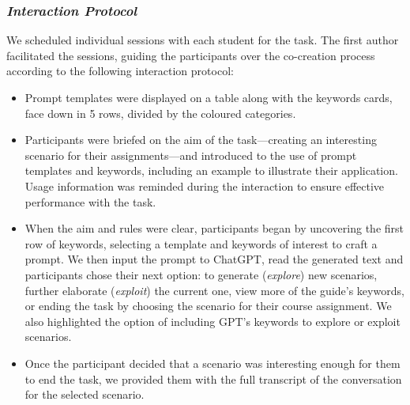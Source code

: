 \documentclass[sn-mathphys, Numbered]{sn-jnl}%
\theoremstyle{thmstyleone}%
\theoremstyle{thmstyletwo}%
\theoremstyle{thmstylethree}%
\begin{document}
\subsubsection*{\textit{Interaction Protocol}}

We scheduled individual sessions with each student for the task. The first author facilitated the sessions, guiding the participants over the co-creation process according to the following interaction protocol:
    \begin{itemize}

        \item  Prompt templates were displayed on a table along with the keywords cards, face down in 5 rows, divided by the coloured categories.
        \item Participants were briefed on the aim of the task---creating an interesting scenario for their assignments---and introduced to the use of prompt templates and keywords, including an example to illustrate their application. Usage information was reminded during the interaction to ensure effective performance with the task.
        \item When the aim and rules were clear, participants began by uncovering the first row of keywords, selecting a template and keywords of interest to craft a prompt. We then input the prompt to ChatGPT, read the generated text and participants chose their next option: to generate (\textit{explore}) new scenarios, further elaborate (\textit{exploit}) the current one, view more of the guide's keywords, or ending the task by choosing the scenario for their course assignment. We also highlighted the option of including GPT's keywords to explore or exploit scenarios.
        \item Once the participant decided that a scenario was interesting enough for them to end the task, we provided them with the full transcript of the conversation for the selected scenario.
    \end{itemize}
\end{document}
